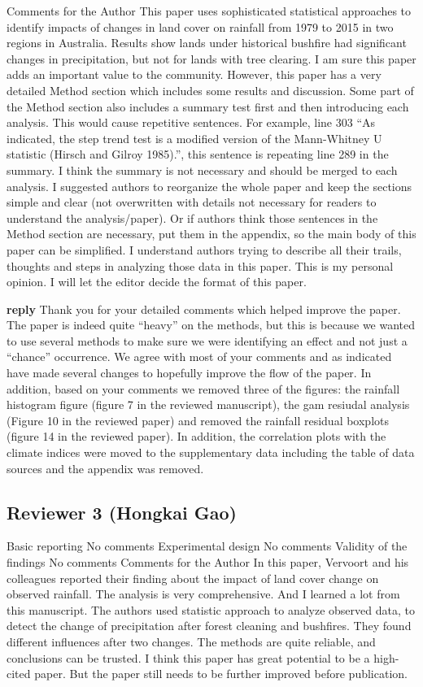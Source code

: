 \documentclass[fleqn,10pt,lineno]{wlpeerj} %
\theoremstyle{definition}
\theoremstyle{definition}
\theoremstyle{definition}
\theoremstyle{remark}
\begin{document}
Comments for the Author This paper uses sophisticated statistical
approaches to identify impacts of changes in land cover on rainfall from
1979 to 2015 in two regions in Australia. Results show lands under
historical bushfire had significant changes in precipitation, but not
for lands with tree clearing. I am sure this paper adds an important
value to the community. However, this paper has a very detailed Method
section which includes some results and discussion. Some part of the
Method section also includes a summary test first and then introducing
each analysis. This would cause repetitive sentences. For example, line
303 ``As indicated, the step trend test is a modified version of the
Mann-Whitney U statistic (Hirsch and Gilroy 1985).'', this sentence is
repeating line 289 in the summary. I think the summary is not necessary
and should be merged to each analysis. I suggested authors to reorganize
the whole paper and keep the sections simple and clear (not overwritten
with details not necessary for readers to understand the
analysis/paper). Or if authors think those sentences in the Method
section are necessary, put them in the appendix, so the main body of
this paper can be simplified. I understand authors trying to describe
all their trails, thoughts and steps in analyzing those data in this
paper. This is my personal opinion. I will let the editor decide the
format of this paper.

\textbf{reply} Thank you for your detailed comments which helped improve
the paper. The paper is indeed quite ``heavy'' on the methods, but this
is because we wanted to use several methods to make sure we were
identifying an effect and not just a ``chance'' occurrence. We agree
with most of your comments and as indicated have made several changes to
hopefully improve the flow of the paper. In addition, based on your
comments we removed three of the figures: the rainfall histogram figure
(figure 7 in the reviewed manuscript), the gam resiudal analysis (Figure
10 in the reviewed paper) and removed the rainfall residual boxplots
(figure 14 in the reviewed paper). In addition, the correlation plots
with the climate indices were moved to the supplementary data including
the table of data sources and the appendix was removed.

\subsection{Reviewer 3 (Hongkai Gao)}\label{reviewer-3-hongkai-gao}

Basic reporting No comments Experimental design No comments Validity of
the findings No comments Comments for the Author In this paper, Vervoort
and his colleagues reported their finding about the impact of land cover
change on observed rainfall. The analysis is very comprehensive. And I
learned a lot from this manuscript. The authors used statistic approach
to analyze observed data, to detect the change of precipitation after
forest cleaning and bushfires. They found different influences after two
changes. The methods are quite reliable, and conclusions can be trusted.
I think this paper has great potential to be a high-cited paper. But the
paper still needs to be further improved before publication.
\end{document}
